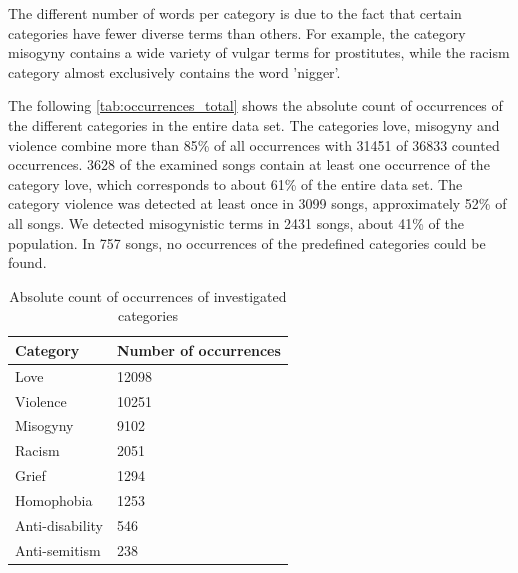 The different number of words per category is due to the fact that certain categories have fewer diverse terms than others. For example, the category misogyny contains a wide variety of vulgar terms for prostitutes, while the racism category almost exclusively contains the word 'nigger'.

The following \autoref{tab:occurrences_total} shows the absolute count of occurrences of the different categories in the entire data set. The categories love, misogyny and violence combine more than 85\% of all occurrences with 31451 of 36833 counted occurrences. 3628 of the examined songs contain at least one occurrence of the category love, which corresponds to about 61\% of the entire data set. The category violence was detected at least once in 3099 songs, approximately 52\% of all songs. We detected misogynistic terms in 2431 songs, about 41\% of the population. In 757 songs, no occurrences of the predefined categories could be found.

\begin{table}[!htb]
    \centering
    \begin{tabular}{|l|l|}
    \hline
    \textbf{Category} & \textbf{Number of occurrences} \\ \hline
    Love              & 12098                          \\ \hline
    Violence          & 10251                          \\ \hline
    Misogyny          & 9102                           \\ \hline
    Racism            & 2051                           \\ \hline
    Grief             & 1294                           \\ \hline
    Homophobia        & 1253                           \\ \hline
    Anti-disability   & 546                            \\ \hline
    Anti-semitism     & 238                            \\ \hline
    \end{tabular}
    \caption{Absolute count of occurrences of investigated categories}
    \label{tab:occurrences_total}
\end{table}

